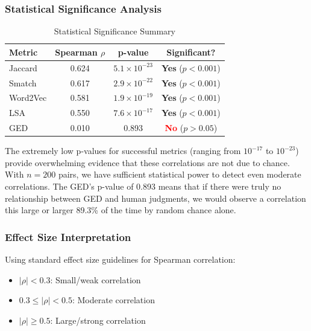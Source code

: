 \documentclass[11pt,a4paper]{article}
\begin{document}
\subsubsection{Statistical Significance Analysis}

\begin{table}[h]
\centering
\caption{Statistical Significance Summary}
\begin{tabular}{lccc}
\toprule
\textbf{Metric} & \textbf{Spearman $\rho$} & \textbf{p-value} & \textbf{Significant?} \\
\midrule
Jaccard & 0.624 & $5.1 \times 10^{-23}$ & \textcolor{green!60!black}{\textbf{Yes}} ($p < 0.001$) \\
Smatch & 0.617 & $2.9 \times 10^{-22}$ & \textcolor{green!60!black}{\textbf{Yes}} ($p < 0.001$) \\
Word2Vec & 0.581 & $1.9 \times 10^{-19}$ & \textcolor{green!60!black}{\textbf{Yes}} ($p < 0.001$) \\
LSA & 0.550 & $7.6 \times 10^{-17}$ & \textcolor{green!60!black}{\textbf{Yes}} ($p < 0.001$) \\
GED & 0.010 & 0.893 & \textcolor{red}{\textbf{No}} ($p > 0.05$) \\
\bottomrule
\end{tabular}
\end{table}

The extremely low p-values for successful metrics (ranging from $10^{-17}$ to $10^{-23}$) provide overwhelming evidence that these correlations are not due to chance. With $n=200$ pairs, we have sufficient statistical power to detect even moderate correlations. The GED's p-value of 0.893 means that if there were truly no relationship between GED and human judgments, we would observe a correlation this large or larger 89.3\% of the time by random chance alone.

\subsubsection{Effect Size Interpretation}

Using standard effect size guidelines for Spearman correlation:
\begin{itemize}
    \item $|\rho| < 0.3$: Small/weak correlation
    \item $0.3 \leq |\rho| < 0.5$: Moderate correlation  
    \item $|\rho| \geq 0.5$: Large/strong correlation
\end{itemize}
\end{document}
